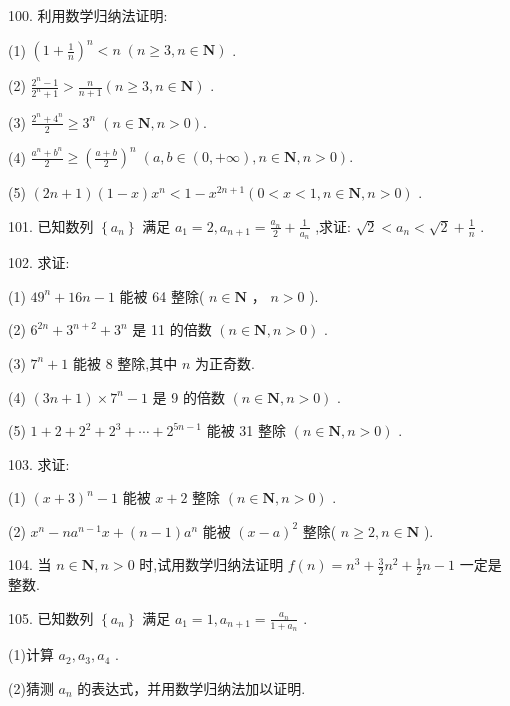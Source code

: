 \documentclass[10pt]{article}
\begin{document}
100. 利用数学归纳法证明:

(1) \({\left( 1 + \frac{1}{n}\right) }^{n} < n\;\left( {n \geq  3,n \in  \mathbf{N}}\right)\) .

(2) \(\frac{{2}^{n} - 1}{{2}^{n} + 1} > \frac{n}{n + 1}\left( {n \geq  3,n \in  \mathbf{N}}\right)\) .

(3) \(\frac{{2}^{n} + {4}^{n}}{2} \geq  {3}^{n}\;\left( {n \in  \mathbf{N},n > 0}\right) .\)

(4) \(\frac{{a}^{n} + {b}^{n}}{2} \geq  {\left( \frac{a + b}{2}\right) }^{n}\;\left( {a,b \in  \left( {0, + \infty }\right) ,n \in  \mathbf{N},n > 0}\right) .\)

(5) \(\left( {{2n} + 1}\right) \left( {1 - x}\right) {x}^{n} < 1 - {x}^{{2n} + 1}\left( {0 < x < 1,n \in  \mathbf{N},n > 0}\right)\) .

101. 已知数列 \(\left\{  {a}_{n}\right\}\) 满足 \({a}_{1} = 2,{a}_{n + 1} = \frac{{a}_{n}}{2} + \frac{1}{{a}_{n}}\) ,求证: \(\sqrt{2} < {a}_{n} < \sqrt{2} + \frac{1}{n}\) .

102. 求证:

(1) \({49}^{n} + {16n} - 1\) 能被 64 整除( \(n \in  \mathbf{N}\) ， \(n > 0\) ).

(2) \({6}^{2n} + {3}^{n + 2} + {3}^{n}\) 是 11 的倍数 \(\left( {n \in  \mathbf{N},n > 0}\right)\) .

(3) \({7}^{n} + 1\) 能被 8 整除,其中 \(n\) 为正奇数.

(4) \(\left( {{3n} + 1}\right)  \times  {7}^{n} - 1\) 是 9 的倍数 \(\left( {n \in  \mathbf{N},n > 0}\right)\) .

(5) \(1 + 2 + {2}^{2} + {2}^{3} + \cdots  + {2}^{{5n} - 1}\) 能被 31 整除 \(\left( {n \in  \mathbf{N},n > 0}\right)\) .

103. 求证:

(1) \({\left( x + 3\right) }^{n} - 1\) 能被 \(x + 2\) 整除 \(\left( {n \in  \mathbf{N},n > 0}\right)\) .

(2) \({x}^{n} - n{a}^{n - 1}x + \left( {n - 1}\right) {a}^{n}\) 能被 \({\left( x - a\right) }^{2}\) 整除( \(n \geq  2,n \in  \mathbf{N}\) ).

104. 当 \(n \in  \mathbf{N},n > 0\) 时,试用数学归纳法证明 \(f\left( n\right)  = {n}^{3} + \frac{3}{2}{n}^{2} + \frac{1}{2}n - 1\) 一定是整数.

105. 已知数列 \(\left\{  {a}_{n}\right\}\) 满足 \({a}_{1} = 1,{a}_{n + 1} = \frac{{a}_{n}}{1 + {a}_{n}}\) .

(1)计算 \({a}_{2},{a}_{3},{a}_{4}\) .

(2)猜测 \({a}_{n}\) 的表达式，并用数学归纳法加以证明.
\end{document}
